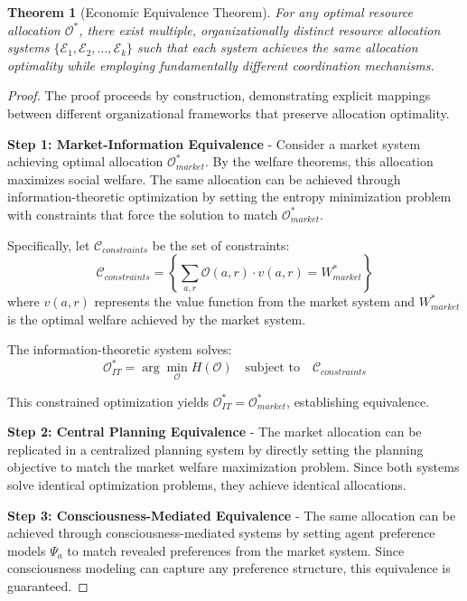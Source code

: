 \documentclass[12pt,a4paper]{article}
\newtheorem{theorem}{Theorem}
\begin{document}
\begin{theorem}[Economic Equivalence Theorem]
For any optimal resource allocation $\mathcal{O}^*$, there exist multiple, organizationally distinct resource allocation systems $\{\mathcal{E}_1, \mathcal{E}_2, \ldots, \mathcal{E}_k\}$ such that each system achieves the same allocation optimality while employing fundamentally different coordination mechanisms.
\end{theorem}

\begin{proof}
The proof proceeds by construction, demonstrating explicit mappings between different organizational frameworks that preserve allocation optimality.

\textbf{Step 1: Market-Information Equivalence} - Consider a market system achieving optimal allocation $\mathcal{O}^*_{market}$. By the welfare theorems, this allocation maximizes social welfare. The same allocation can be achieved through information-theoretic optimization by setting the entropy minimization problem with constraints that force the solution to match $\mathcal{O}^*_{market}$.

Specifically, let $\mathcal{C}_{constraints}$ be the set of constraints:
\begin{equation}
\mathcal{C}_{constraints} = \left\{\sum_{a,r} \mathcal{O}(a,r) \cdot v(a,r) = W^*_{market}\right\}
\end{equation}
where $v(a,r)$ represents the value function from the market system and $W^*_{market}$ is the optimal welfare achieved by the market system.

The information-theoretic system solves:
\begin{equation}
\mathcal{O}^*_{IT} = \arg\min_{\mathcal{O}} H(\mathcal{O}) \quad \text{subject to} \quad \mathcal{C}_{constraints}
\end{equation}

This constrained optimization yields $\mathcal{O}^*_{IT} = \mathcal{O}^*_{market}$, establishing equivalence.

\textbf{Step 2: Central Planning Equivalence} - The market allocation can be replicated in a centralized planning system by directly setting the planning objective to match the market welfare maximization problem. Since both systems solve identical optimization problems, they achieve identical allocations.

\textbf{Step 3: Consciousness-Mediated Equivalence} - The same allocation can be achieved through consciousness-mediated systems by setting agent preference models $\Psi_a$ to match revealed preferences from the market system. Since consciousness modeling can capture any preference structure, this equivalence is guaranteed.


\end{proof}
\end{document}
